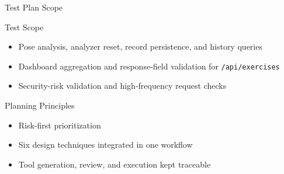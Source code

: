 \begin{frame}{Test Plan Scope}
    \small
    \begin{block}{Test Scope}
        \begin{itemize}
            \item Pose analysis, analyzer reset, record persistence, and history queries
            \item Dashboard aggregation and response-field validation for \texttt{/api/exercises}
            \item Security-risk validation and high-frequency request checks
        \end{itemize}
    \end{block}

    \begin{block}{Planning Principles}
        \begin{itemize}
            \item Risk-first prioritization
            \item Six design techniques integrated in one workflow
            \item Tool generation, review, and execution kept traceable
        \end{itemize}
    \end{block}
\end{frame}

